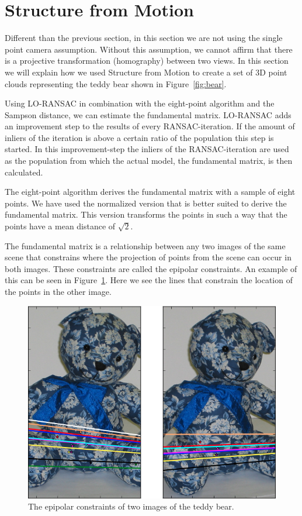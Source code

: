 \section{Structure from Motion}
\label{structure}

Different than the previous section, in this section we are not using the single point camera assumption.
Without this assumption, we cannot affirm that there is a projective transformation (homography) between two views.
In this section we will explain how we used Structure from Motion \cite{SfM} to create a set of 3D point clouds
representing the teddy bear shown in Figure~\ref{fig:bear}.

Using LO-RANSAC in combination with the eight-point algorithm \cite{eightpoint} \cite{eightpoint_fundamental} and the Sampson distance, we can estimate the fundamental matrix.
LO-RANSAC adds an improvement step to the results of every RANSAC-iteration.
If the amount of inliers of the iteration is above a certain ratio of the population this step is started.
In this improvement-step the inliers of the RANSAC-iteration are used as the population from which the actual model, the fundamental matrix, is then calculated.

The eight-point algorithm derives the fundamental matrix with a sample of eight points.
We have used the normalized version that is better suited to derive the fundamental matrix.
This version transforms the points in such a way that the points have a mean distance of $\sqrt{2}$.

The fundamental matrix is a relationship between any two images of the same scene that constrains
where the projection of points from the scene can occur in both images.
These constraints are called the epipolar constraints.
An example of this can be seen in Figure~\ref{fig:epipolar}.
Here we see the lines that constrain the location of the points in the other image.

\begin{figure}[ht]
	\centering
	\includegraphics[width=.5\textwidth]{bear_epi}
	\caption{The epipolar constraints of two images of the teddy bear.}
	\label{fig:epipolar}
\end{figure}

